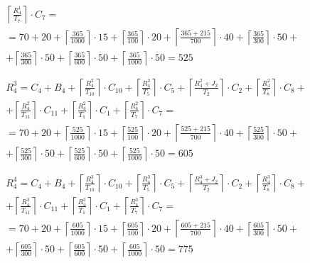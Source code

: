 \begin{gather*}
\begin{multlined}
    \left\lceil\frac{R_4^1}{T_7}\right\rceil\cdot C_7 = \\%
    = 70 + 20 + \left\lceil\frac{365}{1000}\right\rceil\cdot 15 + %
    \left\lceil\frac{365}{100}\right\rceil\cdot 20 + %
    \left\lceil\frac{365 + 215}{700}\right\rceil\cdot 40 + %
    \left\lceil\frac{365}{300}\right\rceil\cdot 50 + \\%
    + \left\lceil\frac{365}{300}\right\rceil\cdot 50 + %
    \left\lceil\frac{365}{600}\right\rceil\cdot 50 + %
    \left\lceil\frac{365}{1000}\right\rceil\cdot 50 = 525 \\
  \end{multlined} \\
  \begin{multlined}
    R_4^3 = C_4 + B_4 + \left\lceil\frac{R_4^2}{T_{10}}\right\rceil\cdot C_{10} + %
    \left\lceil\frac{R_4^2}{T_5}\right\rceil\cdot C_5 + %
    \left\lceil\frac{R_4^2 + J_2}{T_2}\right\rceil\cdot C_2 + %
    \left\lceil\frac{R_4^2}{T_8}\right\rceil\cdot C_8 + \\%
    + \left\lceil\frac{R_4^2}{T_{11}}\right\rceil\cdot C_{11} + %
    \left\lceil\frac{R_4^2}{T_1}\right\rceil\cdot C_1 +%
    \left\lceil\frac{R_4^2}{T_7}\right\rceil\cdot C_7 = \\%
    = 70 + 20 + \left\lceil\frac{525}{1000}\right\rceil\cdot 15 + %
    \left\lceil\frac{525}{100}\right\rceil\cdot 20 + %
    \left\lceil\frac{525 + 215}{700}\right\rceil\cdot 40 + %
    \left\lceil\frac{525}{300}\right\rceil\cdot 50 + \\%
    + \left\lceil\frac{525}{300}\right\rceil\cdot 50 + %
    \left\lceil\frac{525}{600}\right\rceil\cdot 50 + %
    \left\lceil\frac{525}{1000}\right\rceil\cdot 50 = 605 \\
  \end{multlined} \\
  \begin{multlined}
    R_4^4 = C_4 + B_4 + \left\lceil\frac{R_4^3}{T_{10}}\right\rceil\cdot C_{10} + %
    \left\lceil\frac{R_4^3}{T_5}\right\rceil\cdot C_5 + %
    \left\lceil\frac{R_4^3 + J_2}{T_2}\right\rceil\cdot C_2 + %
    \left\lceil\frac{R_4^3}{T_8}\right\rceil\cdot C_8 + \\%
    + \left\lceil\frac{R_4^3}{T_{11}}\right\rceil\cdot C_{11} + %
    \left\lceil\frac{R_4^3}{T_1}\right\rceil\cdot C_1 +%
    \left\lceil\frac{R_4^3}{T_7}\right\rceil\cdot C_7 = \\%
    = 70 + 20 + \left\lceil\frac{605}{1000}\right\rceil\cdot 15 + %
    \left\lceil\frac{605}{100}\right\rceil\cdot 20 + %
    \left\lceil\frac{605 + 215}{700}\right\rceil\cdot 40 + %
    \left\lceil\frac{605}{300}\right\rceil\cdot 50 + \\%
    + \left\lceil\frac{605}{300}\right\rceil\cdot 50 + %
    \left\lceil\frac{605}{600}\right\rceil\cdot 50 + %
    \left\lceil\frac{605}{1000}\right\rceil\cdot 50 = 775 \\
  \end{multlined} \\
\end{gather*}
